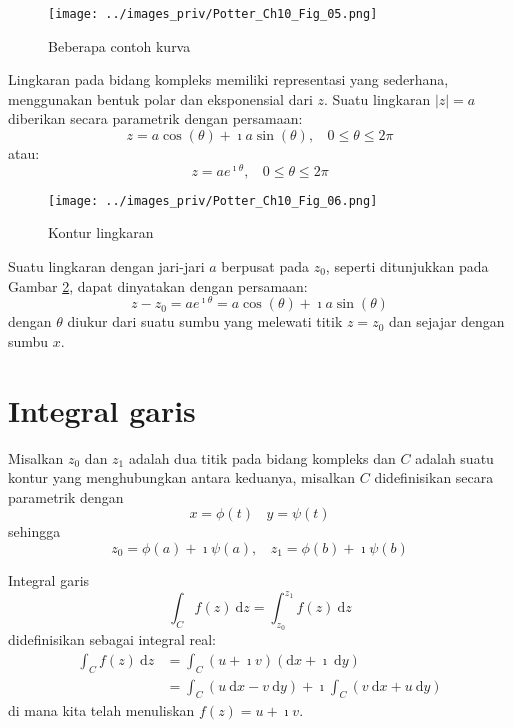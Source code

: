 \begin{figure}[h]
{\centering
\texttt{[image: ../images\_priv/Potter\_Ch10\_Fig\_05.png]}
\par}
\caption{Beberapa contoh kurva}\label{fig:Potter_Fig_10_05}
\end{figure}

Lingkaran pada bidang kompleks memiliki representasi yang sederhana,
menggunakan bentuk polar dan eksponensial dari $z$. Suatu lingkaran
$|z|=a$ diberikan secara parametrik dengan persamaan:
\begin{equation*}
z=a\cos(\theta)+\imath a\sin(\theta),\ \ \ \ 0\leq\theta\leq2\pi
\end{equation*}
atau:
\begin{equation*}
z=ae^{\imath\theta},\ \ \ \ 0\leq\theta\leq2\pi
\end{equation*}

\begin{figure}[h]
{\centering
\texttt{[image: ../images\_priv/Potter\_Ch10\_Fig\_06.png]}
\par}
\caption{Kontur lingkaran}\label{fig:Potter_Fig_10_06}
\end{figure}

Suatu lingkaran dengan jari-jari $a$ berpusat pada $z_{0}$,
seperti ditunjukkan pada Gambar \ref{fig:Potter_Fig_10_06},
dapat dinyatakan dengan persamaan:
\begin{equation*}
z-z_{0}  = ae^{\imath\theta} = a\cos(\theta) + \imath a\sin(\theta)
\end{equation*}
dengan $\theta$ diukur dari suatu sumbu yang melewati titik $z=z_{0}$
dan sejajar dengan sumbu $x$.

\section{Integral garis}

Misalkan $z_{0}$ dan $z_{1}$ adalah dua titik pada bidang kompleks
dan $C$ adalah suatu kontur yang menghubungkan antara keduanya, misalkan
$C$ didefinisikan secara parametrik dengan
\begin{equation*}
x=\phi(t)\ \ \ \ y=\psi(t)
\end{equation*}
sehingga
\begin{equation*}
z_{0}=\phi(a)+\imath\psi(a),\ \ \ \ z_{1}=\phi(b)+\imath\psi(b)
\end{equation*}

Integral garis
\begin{equation*}
\int_{C}f(z)\ \mathrm{d}z=\int_{z_{0}}^{z_{1}}f(z)\ \mathrm{d}z
\end{equation*}
didefinisikan sebagai integral real:
\begin{align}
\int_{C}f(z)\ \mathrm{d}z & = \int_{C}(u + \imath v)(\mathrm{d}x+\imath\ \mathrm{d}y) \nonumber \\
 & =\int_{C}(u\ \mathrm{d}x - v \ \mathrm{d}y) +
 \imath\int_{C}(v\ \mathrm{d}x + u\ \mathrm{d}y) \label{eq:integ_line}
\end{align}
di mana kita telah menuliskan $f(z) = u + \imath v$.

